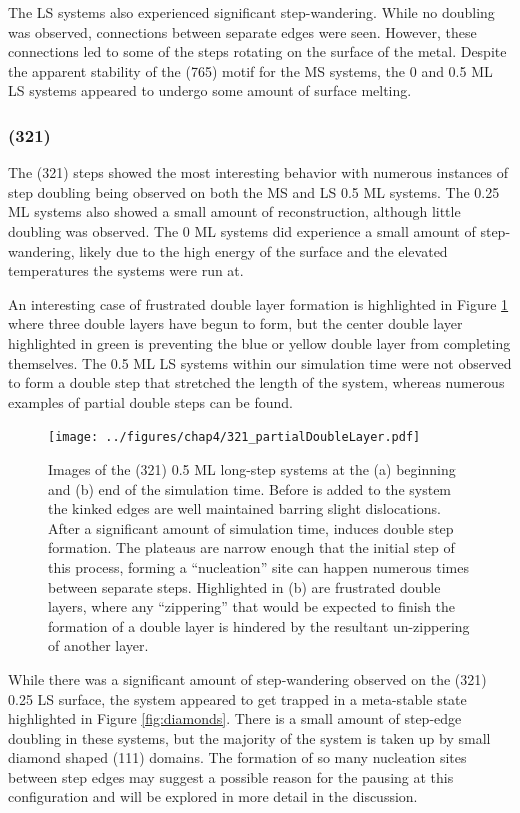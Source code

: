 The LS systems also experienced significant step-wandering. While no doubling
was observed, connections between separate edges were seen. However, these
connections led to some of the steps rotating on the surface of the metal.
Despite the apparent stability of the (765) motif for the MS systems, the 0 and
0.5 ML LS systems appeared to undergo some amount of surface melting.

\subsubsection{ (321)}
The (321) steps showed the most interesting behavior with numerous instances of
step doubling being observed on both the MS and LS 0.5 ML systems. The 0.25 ML
systems also showed a small amount of reconstruction, although little doubling
was observed. The 0 ML systems did experience a small amount of step-wandering,
likely due to the high energy of the surface and the elevated temperatures the
systems were run at.

An interesting case of frustrated double layer formation is highlighted in
Figure \ref{fig:partialDoubleLayer} where three double layers have begun to form,
but the center double layer highlighted in green is preventing the blue or
yellow double layer from completing themselves. The 0.5 ML LS systems within
our simulation time were not observed to form a double step that stretched the
length of the system, whereas numerous examples of partial double steps can be
found.

\begin{figure}
\centering
\texttt{[image: ../figures/chap4/321\_partialDoubleLayer.pdf]}
\caption{Images of the (321) 0.5 ML long-step systems at the (a) beginning and
(b) end of the simulation time. Before  is added to the system the
kinked edges are well maintained barring slight dislocations. After a
significant amount of simulation time,  induces double step formation.
The plateaus are narrow enough that the initial step of this process, forming a
``nucleation'' site can happen numerous times between separate steps.
Highlighted in (b) are frustrated double layers, where any ``zippering'' that
would be expected to finish the formation of a double layer is hindered by the
resultant un-zippering of another layer.}
\label{fig:partialDoubleLayer}
\end{figure}

While there was a significant amount of step-wandering observed on the (321)
0.25 LS surface, the system appeared to get trapped in a meta-stable state
highlighted in Figure \ref{fig:diamonds}. There is a small amount of step-edge
doubling in these systems, but the majority of the system is taken up by small
diamond shaped (111) domains. The formation of so many nucleation sites between
step edges may suggest a possible reason for the pausing at this configuration
and will be explored in more detail in the discussion.

